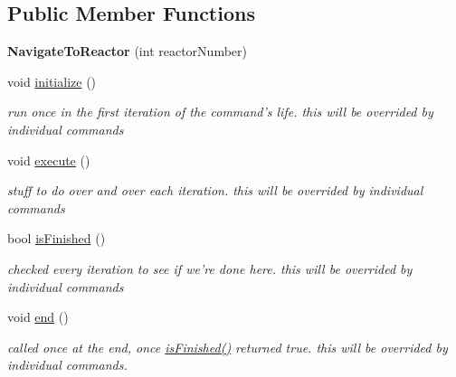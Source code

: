 \subsection*{Public Member Functions}
\begin{DoxyCompactItemize}
\item 
\hypertarget{classNavigateToReactor_a66a709e79a4c6dc0e7583c9d9a47200d}{{\bfseries Navigate\-To\-Reactor} (int reactor\-Number)}\label{classNavigateToReactor_a66a709e79a4c6dc0e7583c9d9a47200d}

\item 
\hypertarget{classNavigateToReactor_a8b319bd246a3d1c818e38e82ed6ab25f}{void \hyperlink{classNavigateToReactor_a8b319bd246a3d1c818e38e82ed6ab25f}{initialize} ()}\label{classNavigateToReactor_a8b319bd246a3d1c818e38e82ed6ab25f}

\begin{DoxyCompactList}\small\item\em run once in the first iteration of the command's life. this will be overrided by individual commands \end{DoxyCompactList}\item 
\hypertarget{classNavigateToReactor_a50a9743b979ee2a5b35866bbad6f1faa}{void \hyperlink{classNavigateToReactor_a50a9743b979ee2a5b35866bbad6f1faa}{execute} ()}\label{classNavigateToReactor_a50a9743b979ee2a5b35866bbad6f1faa}

\begin{DoxyCompactList}\small\item\em stuff to do over and over each iteration. this will be overrided by individual commands \end{DoxyCompactList}\item 
bool \hyperlink{classNavigateToReactor_ae1619462539af71d2ba9ea167db9dfaf}{is\-Finished} ()
\begin{DoxyCompactList}\small\item\em checked every iteration to see if we're done here. this will be overrided by individual commands \end{DoxyCompactList}\item 
\hypertarget{classNavigateToReactor_a8d42713588dfb661c778ff6aad6c0085}{void \hyperlink{classNavigateToReactor_a8d42713588dfb661c778ff6aad6c0085}{end} ()}\label{classNavigateToReactor_a8d42713588dfb661c778ff6aad6c0085}

\begin{DoxyCompactList}\small\item\em called once at the end, once \hyperlink{classNavigateToReactor_ae1619462539af71d2ba9ea167db9dfaf}{is\-Finished()} returned true. this will be overrided by individual commands. \end{DoxyCompactList}\end{DoxyCompactItemize}
